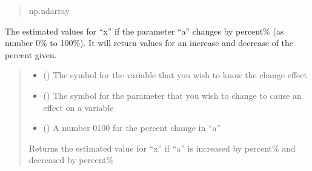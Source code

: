 \documentclass[letterpaper,10pt,english]{sphinxmanual}
\begin{document}
\begin{fulllineitems}
\begin{fulllineitems}
\begin{quote}
\begin{description}
\sphinxAtStartPar
np.ndarray

\end{description}\end{quote}

\end{fulllineitems}


\begin{fulllineitems}
\label{\detokenize{src.sensitivity.faster_sensitivity:src.sensitivity.faster_sensitivity.SensitivityMatrix.get_sensitivity_range}}
\pysigstartsignatures
\pysiglinewithargsret
{}
{\sphinxparamcomma {}\sphinxparamcomma {}}
{}
\pysigstopsignatures
\sphinxAtStartPar
The estimated values for “x” if the parameter “a” changes by percent\% (as number 0\% to 100\%).
It will return values for an increase and decrease of the percent given.
\begin{quote}\begin{description}
\begin{itemize}
\item {} 
\sphinxAtStartPar
{} () \textendash{} The symbol for the variable that you wish to know the change effect

\item {} 
\sphinxAtStartPar
{} () \textendash{} The symbol for the parameter that you wish to change to cause an effect on a variable

\item {} 
\sphinxAtStartPar
{} () \textendash{} A number 0\sphinxhyphen{}100 for the percent change in “a”

\end{itemize}

\sphinxAtStartPar
Returns the estimated value for “x” if “a” is increased by percent\% and decreased by percent\%


\end{description}
\end{quote}
\end{fulllineitems}
\end{fulllineitems}
\end{document}
